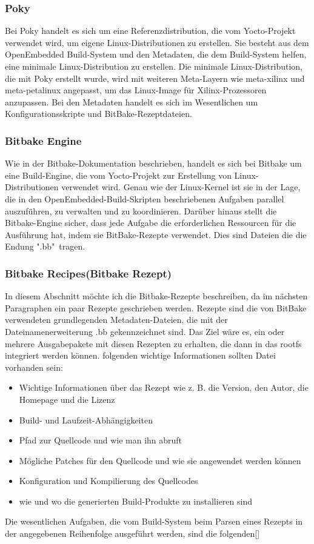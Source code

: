 \subsubsection{Poky}
Bei Poky handelt es sich um eine Referenzdistribution, die vom Yocto-Projekt verwendet wird, um eigene Linux-Distributionen zu erstellen. Sie besteht aus dem OpenEmbedded Build-System und den Metadaten, die dem Build-System helfen, eine minimale Linux-Distribution zu erstellen. Die minimale Linux-Distribution, die mit Poky erstellt wurde, wird mit weiteren Meta-Layern wie meta-xilinx und meta-petalinux angepasst, um das Linux-Image für Xilinx-Prozessoren anzupassen. Bei den Metadaten handelt es sich im Wesentlichen um Konfigurationsskripte und BitBake-Rezeptdateien.

\subsubsection{Bitbake Engine}

Wie in der Bitbake-Dokumentation beschrieben, handelt es sich bei Bitbake um eine Build-Engine, die vom Yocto-Projekt zur Erstellung von Linux-Distributionen verwendet wird. Genau wie der Linux-Kernel ist sie in der Lage, die in den OpenEmbedded-Build-Skripten beschriebenen Aufgaben parallel auszuführen, zu verwalten und zu koordinieren. Darüber hinaus stellt die Bitbake-Engine sicher, dass jede Aufgabe die erforderlichen Ressourcen für die Ausführung hat, indem sie BitBake-Rezepte verwendet. Dies sind Dateien die die Endung ".bb"\ tragen.

\subsubsection{Bitbake Recipes(Bitbake Rezept)}
In diesem Abschnitt möchte ich die Bitbake-Rezepte beschreiben, da im nächsten Paragraphen ein paar Rezepte geschrieben werden. 
Rezepte sind die von BitBake verwendeten grundlegenden Metadaten-Dateien, die mit der Dateinamenerweiterung .bb gekennzeichnet sind. Das Ziel wäre es, ein oder mehrere Ausgabepakete mit diesen Rezepten zu erhalten, die dann in das rootfs integriert werden können. folgenden wichtige Informationen sollten Datei vorhanden sein: 
\begin{itemize}
	\item Wichtige Informationen über das Rezept wie z. B. die Version, den Autor, die Homepage und die Lizenz
	\item Build- und Laufzeit-Abhängigkeiten
	\item Pfad zur Quellcode und wie man ihn abruft
	\item Mögliche Patches für den Quellcode und wie sie angewendet werden können
	\item Konfiguration und Kompilierung des Quellcodes
	\item wie und wo die generierten Build-Produkte zu installieren sind
\end{itemize}
Die wesentlichen Aufgaben, die vom Build-System beim Parsen eines Rezepts in der angegebenen Reihenfolge ausgeführt werden, sind die folgenden[\cite{YoctoProj}]

